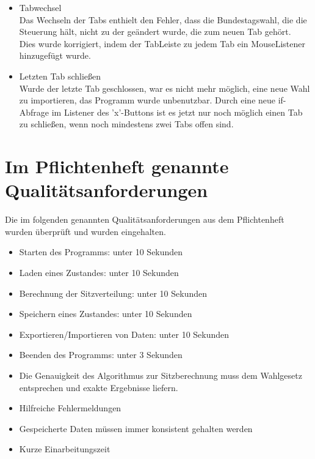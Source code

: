 \documentclass[12pt,a4paper,titlepage]{article}
\begin{document}
\begin{itemize}
\item Tabwechsel\\
Das Wechseln der Tabs enthielt den Fehler, dass die Bundestagswahl, die die Steuerung hält, nicht zu der geändert wurde, die zum neuen Tab gehört.\\
Dies wurde korrigiert, indem der TabLeiste zu jedem Tab ein MouseListener hinzugefügt wurde.\\

\item Letzten Tab schließen\\
Wurde der letzte Tab geschlossen, war es nicht mehr möglich, eine neue Wahl zu importieren, das Programm wurde unbenutzbar. Durch eine neue if-Abfrage im Listener des 'x'-Buttons ist es jetzt nur noch möglich einen Tab zu schließen, wenn noch mindestens zwei Tabs offen sind. \\

\end{itemize}

\section{Im Pflichtenheft genannte Qualitätsanforderungen}
Die im folgenden genannten Qualitätsanforderungen aus dem Pflichtenheft wurden überprüft und wurden eingehalten.

\begin{itemize}
\item Starten des Programms: unter 10 Sekunden
\item Laden eines Zustandes: unter 10 Sekunden
\item Berechnung der Sitzverteilung: unter 10 Sekunden
\item Speichern eines Zustandes: unter 10 Sekunden
\item Exportieren/Importieren von Daten: unter 10 Sekunden
\item Beenden des Programms: unter 3 Sekunden\\

\item Die Genauigkeit des Algorithmus zur Sitzberechnung muss dem Wahlgesetz entsprechen und exakte Ergebnisse liefern.

\item Hilfreiche Fehlermeldungen

\item Gespeicherte Daten müssen immer konsistent gehalten werden
\item Kurze Einarbeitungszeit

\end{itemize}
\end{document}

